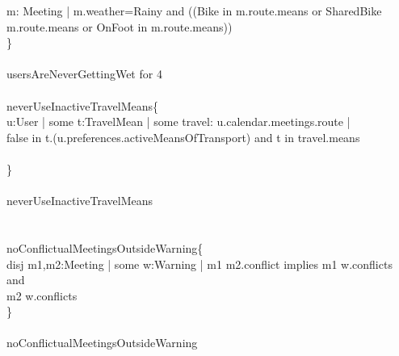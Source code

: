         \qquad \- m: Meeting | m.weather=Rainy {\color{blue}and} ((Bike {\color{blue}in} m.route.means {\color{blue}or} SharedBike \\
        \qquad \-\qquad \-\qquad \-\qquad \-\qquad \-\qquad \-\qquad \- m.route.means {\color{blue}or} OnFoot {\color{blue}in} m.route.means))\\
        \qquad \}\\
        \qquad \\
         usersAreNeverGettingWet {\color{blue}for} 4\\
        \qquad \\
         neverUseInactiveTravelMeans\{\\
        \qquad  \- u:User | {\color{blue}some} t:TravelMean | {\color{blue}some} travel: u.calendar.meetings.route |\\
        \qquad \-\qquad  false {\color{blue}in} t.(u.preferences.activeMeansOfTransport) {\color{blue}and} t {\color{blue}in} travel.means\\
        \qquad \-\qquad \\
        \qquad \}\\
        \qquad \\
         neverUseInactiveTravelMeans\\
        \qquad \\
        \qquad \\
         noConflictualMeetingsOutsideWarning\{\\
        \qquad \- disj m1,m2:Meeting | {\color{blue}some} w:Warning | m1  m2.conflict {\color{blue}implies} m1  w.conflicts and\\
        \qquad \-\qquad \-\qquad \-\qquad \-\qquad \-\qquad \-\qquad \-\qquad \-\qquad m2  w.conflicts\\
        \qquad \}\\
        \qquad \\
         noConflictualMeetingsOutsideWarning\\
        \qquad \\
        \\
